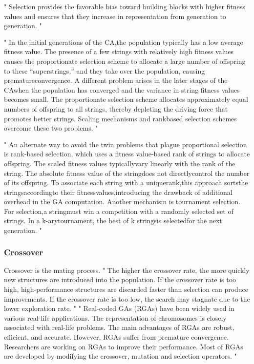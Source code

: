 "
Selection provides the favorable bias toward building blocks with higher fitness values and ensures that they increase in representation from generation to generation.
"\cite{srinivas_genetic_1994}


"
In the initial generations of the CA,the population typically has a low average fitness value. The presence of a few strings with relatively high fitness values causes the proportionate selection scheme to allocate a large number of offspring to these “superstrings,” and they take over the population, causing prematureconvergence. A different problem arises in the later stages of the CAwhen the population has converged and the variance in string fitness values becomes small. The proportionate selection scheme allocates approximately equal numbers of offspring to all strings, thereby depleting the driving force that promotes better strings. Scaling mechanisms and rankbased selection schemes overcome these two problems.
"\cite{srinivas_genetic_1994}

"
An alternate way to avoid the twin problems that plague proportional selection is rank-based selection, which uses a fitness value-based rank of strings to allocate offspring. The scaled fitness values typicallyvary linearly with the rank of the string. The absolute fitness value of the stringdoes not directlycontrol the number of its offspring. To associate each string with a uniquerank,this approach sortsthe stringsaccordingto their fitnessvalues,introducing the drawback of additional overhead in the GA computation. Another mechanism is tournament selection. For selection,a stringmust win a competition with a randomly selected set of strings. In a k-arytournament, the best of k stringsis selectedfor the next generation.
"\cite{srinivas_genetic_1994}

\subsubsection{Crossover}
Crossover is the mating process.
"
The higher the crossover rate, the more quickly new structures are introduced into the population. If the crossover rate is too high, high-performance structures are discarded faster than selection can produce improvements. If the crossover rate is too low, the search may stagnate due to the lower exploration rate.
"\cite{grefenstette_optimization_1986}
"
Real-coded GAs (RGAs) have been widely used in various real-life applications. The representation of chromosomes is closely associated with real-life problems. The main advantages of RGAs are robust, efficient, and accurate. However, RGAs suffer from premature convergence. Researchers are working on RGAs to improve their performance. Most of RGAs are developed by modifying the crossover, mutation and selection operators.
"\cite{katoch_review_2021}


